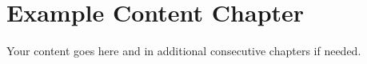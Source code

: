 
\chapter{Example Content Chapter}

Your content goes here and in additional consecutive chapters if needed.
